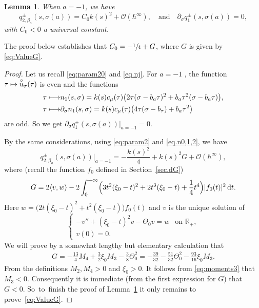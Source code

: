 \documentclass[JEP,XML,SOM,Unicode,NoFloatCountersInSection,published]{cedram}
\newcommand\mto{\mathchoice{\longmapsto}{\mapsto}{\mapsto}{\mapsto}}
\newcommand{\rd}{\,\mathrm{d}}
\theoremstyle{plain}
\newtheorem{lemma}[theorem]{Lemma}
\theoremstyle{definition}
\newcommand{\R}{\mathbb{R}}
\begin{document}
\begin{lemma}\label{lem.a=-1}
When $a=-1$, we have
\[
q_{2,\beta_a}^\pm(s,\sigma(a))=C_0 k(s)^2 +\mathscr O(\hbar^{\infty}),\quad\text{and}\quad \partial_\sigma q_1^\pm(s,\sigma(a))=0,
\]
with $C_0<0$ a universal constant.
\end{lemma}

The proof below establishes that $C_0 = -\sfrac{1}{4} + G$, where $G$ is given by \eqref{eq:ValueG}.

\begin{proof}
Let us recall \eqref{eq:param20} and \eqref{eq.nj}.
For $a=-1$ , the function $\tau\mto \overset{\circ}{u}_{\sigma}(\tau)$ is even and the functions
\[
\begin{aligned}
\tau\mto &n_1(s,\sigma)=k(s)c_\mu(\tau)\bigl(2\tau(\sigma-b_a\tau)^2+b_a\tau^2(\sigma-b_a\tau)\bigr),\\
\tau\mto & \partial_\sigma n_1(s,\sigma)=k(s)c_\mu(\tau)\bigl(4\tau(\sigma-b_\tau)+b_a\tau^2\bigr)
\end{aligned}
\]
are odd. So we get $\partial_\sigma q^\pm_1(s,\sigma(a))|_{a=-1}=0$.

By the same considerations, using \eqref{eq:param2} and \eqref{eq.n0,1,2}, we have
\[
q_{2,\beta_a}^\pm(s,\sigma(a))|_{a=-1}=-\frac{k(s)^2}{4}+k(s)^2G +\mathscr O(\hbar^{\infty}),
\]
where (recall the function $f_0$ defined in Section~\ref{sec.dG})
\begin{equation}\label{eq.G}
G=2\langle v,w\rangle -2\int_0^{+\infty} \Bigl(3t^2(\xi_0-t)^2+2t^3(\xi_0-t)+\frac14t^4\Bigr)|f_0(t)|^2\rd t.
\end{equation}
Here $w=\bigl(2t(\xi_0-t)^2+t^2(\xi_0-t)\bigr)f_0(t)$ and $v$ is the unique solution of
\[
\begin{cases}\label{eq.f=Rw}
-v''+(\xi_0-t)^2v -\Theta_0 v=w&\text{on~}\R_+,\\
v(0)=0.
\end{cases}
\]
We will prove by a somewhat lengthy but elementary calculation that 
\begin{align}\label{eq:ValueG}
G=-\frac{13}{4}M_4+\frac32\xi_0M_3-\frac{3}{8}\Theta_0^2=-\frac{39}{32}-\frac{51}{32}\Theta_0^2-\frac{93}{16}\xi_0M_3.
\end{align}
From the definitions $M_2, M_4>0$ and $\xi_0>0$. It follows from \eqref{eq:moments3} that $M_3<0$. Consequently it is immediate (from the first expression for $G$) that $G<0$. So~to~finish the proof of Lemma~\ref{lem.a=-1} it only remains to prove~\eqref{eq:ValueG}.


\end{proof}
\end{document}
